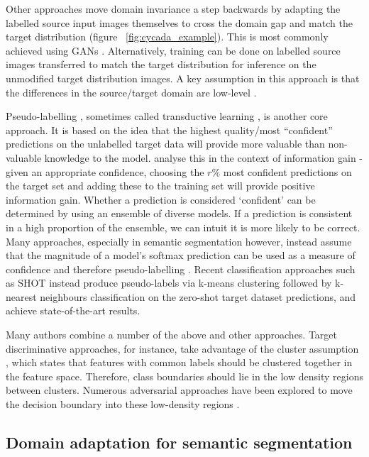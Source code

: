 \documentclass[a4paper,12pt]{report}
\begin{document}
    Other approaches move domain invariance a step backwards by adapting the labelled source input images themselves to cross the domain gap and match the target distribution \cite{wilson_survey_2020} (figure ~\ref{fig:cycada_example}). This is most commonly achieved using GANs \cite{mirza_conditional_2014} \cite{hoffman_cycada_2017}. Alternatively, training can be done on labelled source images transferred to match the target distribution for inference on the unmodified target distribution images. A key assumption in this approach is that the differences in the source/target domain are low-level \cite{wilson_survey_2020}.

    Pseudo-labelling \cite{wilson_survey_2020}, sometimes called transductive learning \cite{kamnitsas_transductive_2021}, is another core approach. It is based on the idea that the highest quality/most “confident” predictions on the unlabelled target data will provide more valuable than non-valuable knowledge to the model. \cite{kamnitsas_transductive_2021} analyse this in the context of information gain - given an appropriate confidence, choosing the $r\%$ most confident predictions on the target set and adding these to the training set will provide positive information gain. Whether a prediction is considered ‘confident’ can be determined by using an ensemble of diverse models. If a prediction is consistent in a high proportion of the ensemble, we can intuit it is more likely to be correct. Many approaches, especially in semantic segmentation however, instead assume that the magnitude of a model’s softmax prediction can be used as a measure of confidence and therefore pseudo-labelling \cite{zou_domain_2018}. Recent classification approaches such as SHOT \cite{liang_we_2021} instead produce pseudo-labels via k-means clustering followed by k-nearest neighbours classification on the zero-shot \cite{larochelle_zero-data_2008} target dataset predictions, and achieve state-of-the-art results.
    
    Many authors combine a number of the above and other approaches. Target discriminative approaches, for instance, take advantage of the cluster assumption \cite{chapelle_semi-supervised_2005}, which states that features with common labels should be clustered together in the feature space. Therefore, class boundaries should lie in the low density regions between clusters. Numerous adversarial approaches have been explored to move the decision boundary into these low-density regions \cite{wilson_survey_2020}.
    
    \subsection{Domain adaptation for semantic segmentation}
    
\end{document}

